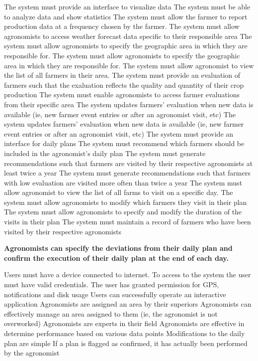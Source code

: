 \begin{itemize}
\begin{itemize}
 The system must provide an interface to visualize data
 The system must be able to analyze data and show statistics
 The system must allow the farmer to report production data at a frequency chosen by the farmer.
 The system must allow agronomists to access weather forecast data specific to their responsible area
 The system must allow agronomists to specify the geographic area in which they are responsible for.
 The system must allow agronomists to specify the geographic area in which they are responsible for.
  The system must allow agronomist to view the list of all farmers in their area.
  The system must provide an evaluation of farmers such that the exaluation reflects the quality and quantity of their crop production
  The system must enable agronomists to access farmer evaluations from their specific area
  The system updates farmers' evaluation when new data is available (ie, new farmer event entries or after an agronomist visit, etc)
  The system updates farmers' evaluation when new data is available (ie, new farmer event entries or after an agronomist visit, etc)
  The system must provide an interface for daily plans
  The system must recommend which farmers should be included in the agronomist's daily plan
  The system must generate recommendations such that farmers are visited by their respective agronomists at least twice a year
  The system must generate recommendations such that farmers with low evaluation are visited more often than twice a year
  The system must allow agronomist to view the list of all farms to visit on a specific day.
  The system must allow agronomists to modify which farmers they visit in their plan
  The system must allow agronomists to specify and modify the duration of the visits in their plan
  The system must maintain a record of farmers who have been visited by their respective agronomists
\end{itemize}

 \textbf{Agronomists can specify the deviations from their daily plan and confirm the execution of their daily plan at the end of each day.}
\begin{itemize}
  Users must have a device connected to internet.
 To access to the system the user must have valid credentials.
 The user has granted permission for GPS, notifications and disk usage
 Users can successfully operate an interactive application
 Agronomists are assigned an area by their superiors
 Agronomists can effectively manage an area assigned to them (ie, the agronomist is not overworked)
 Agronomists are experts in their field
 Agronomists are effective in determine performance based on various data points
 Modifications to the daily plan are simple
 If a plan is flagged as confirmed, it has actually been performed by the agronomist



\end{itemize}
\end{itemize}
